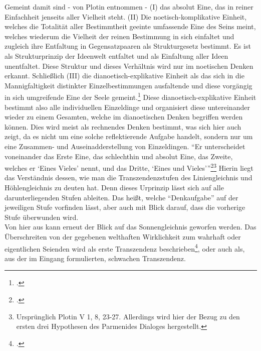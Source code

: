 Gemeint damit sind - von Plotin entnommen - (I) das absolut Eine, das in reiner Einfachheit jenseits aller Vielheit steht. (II) Die noetisch-komplikative Einheit, welches die Totalität aller Bestimmtheit geeinte umfassende Eine des Seins meint, welches wiederum die Vielheit der reinen Bestimmung in sich einfaltet und zugleich ihre Entfaltung in Gegensatzpaaren als Strukturgesetz bestimmt. Es ist als Strukturprinzip der Ideenwelt entfaltet und als Einfaltung aller Ideen unentfaltet. Diese Struktur und dieses Verhältnis wird nur im noetischen Denken erkannt. Schließlich (III) die dianoetisch-explikative Einheit als das sich in die Mannigfaltigkeit distinkter Einzelbestimmungen ausfaltende und diese vorgängig in sich umgreifende Eine der Seele gemeint.\footcite[vgl.][S. 190]{halfwassenaufstieg2006} Diese dianoetisch-explikative Einheit bestimmt also alle individuellen Einzeldinge und organisiert diese untereinander wieder zu einem Gesamten, welche im dianoetischen Denken begriffen werden können. Dies wird meist als rechnendes Denken bestimmt, was sich hier auch zeigt, da es nicht um eine solche reflektierende Aufgabe handelt, sondern nur um eine Zusammen- und Auseinadderstellung von Einzeldingen. 
\enquote{Er unterscheidet voneinander das Erste Eine, das schlechthin und absolut Eine, das Zweite, welches er \enquote{Eines Vieles} nennt, und das Dritte, \enquote{Eines und Vieles}}\footcite[][S. 187f.]{halfwassenaufstieg2006}\footnote{Ursprünglich Plotin V 1, 8, 23-27. Allerdings wird hier der Bezug zu den ersten drei Hypothesen des Parmenides Dialoges hergestellt.}
Hierin liegt das Verständnis dessen, wie man die Transzendenzstufen des Liniengleichnis und Höhlengleichnis zu deuten hat. Denn dieses Urprinzip lässt sich auf alle darunterliegenden Stufen ableiten. Das heißt, welche \enquote{Denkaufgabe} auf der jeweiligen Stufe vorfinden lässt, aber auch mit Blick darauf, dass die vorherige Stufe überwunden wird.\\
Von hier aus kann erneut der Blick auf das Sonnengleichnis geworfen werden.
Das Überschreiten von der gegebenen welthaften Wirklichkeit zum wahrhaft oder eigentlichen Seienden wird als erste Transzendenz beschrieben\footcite[vgl.][S. 222]{halfwassenaufstieg2006}, oder auch als, aus der im Eingang formulierten, schwachen Transzendenz.
